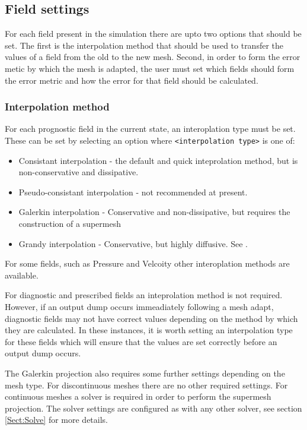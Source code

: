 \subsection{Field settings}

For each field present in the simulation there are upto two options that should be set. The first
is the interpolation method that should be used to transfer the values of a field from the old to the new mesh.
Second, in order to form the error metic by which the mesh is adapted, the user must set which fields
should form the error metric and how the error for that field should be calculated.

\subsubsection{Interpolation method}

For each prognostic field in the current state, an interoplation type must be set. These can be set by selecting an
option  where \texttt{<interpolation type>} is one of:
\begin{itemize}
\item Consistant interpolation - the default and quick inteprolation method, but is non-conservative and dissipative.
\item Pseudo-consistant interpolation - not recommended at present.
\item Galerkin interpolation - Conservative and non-dissipative, but requires the construction of a supermesh
\item Grandy interpolation - Conservative, but highly diffusive. See \citet{grandy1999}.
\end{itemize}

For some fields, such as Pressure and Velcoity other interoplation methods are available.

For diagnostic and prescribed fields an inteprolation method is not required. However, if an output dump
occurs immeadiately following a mesh adapt, diagnostic fields may not have correct values depending
on the method by which they are calculated. In these instances, it is worth setting an interpolation type
for these fields which will ensure that the values are set correctly before an output dump occurs.

The Galerkin projection also requires some further settings depending on the mesh type. For discontinuous
meshes there are no other required settings. For continuous meshes a solver is required in order
to perform the supermesh projection. The solver settings are configured as with any other solver, see
section \ref{Sect:Solve} for more details.

